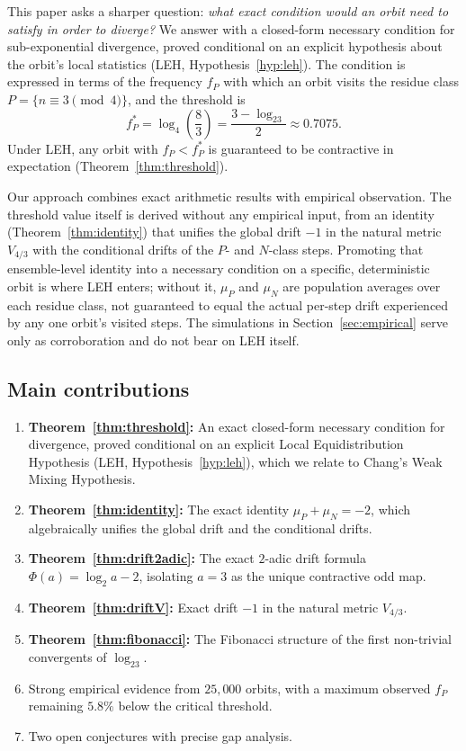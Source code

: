 \documentclass[12pt,reqno]{amsart}
\theoremstyle{plain}
\theoremstyle{definition}
\newcommand{\logtwo}{\log_2}
\newcommand{\logfour}{\log_4}
\newcommand{\fP}{f_P}
\newcommand{\fPstar}{f_P^*}
\newcommand{\muP}{\mu_P}
\newcommand{\muN}{\mu_N}
\newcommand{\PhiDrift}{\Phi}
\newcommand{\Vmetric}{V_{4/3}}
\begin{document}
This paper asks a sharper question: \emph{what exact condition would an orbit need
to satisfy in order to diverge?} We answer with a closed-form necessary condition
for sub-exponential divergence, proved conditional on an explicit hypothesis about
the orbit's local statistics (LEH, Hypothesis~\ref{hyp:leh}).
The condition is expressed in terms of the frequency $\fP$ with which an orbit
visits the residue class $P = \{n \equiv 3 \pmod{4}\}$, and the threshold is
\begin{equation}\label{eq:threshold}
\fPstar = \logfour\!\left(\frac{8}{3}\right) = \frac{3 - \logtwo 3}{2} \approx 0.7075.
\end{equation}
Under LEH, any orbit with $\fP < \fPstar$ is guaranteed to be contractive in expectation
(Theorem~\ref{thm:threshold}).

Our approach combines exact arithmetic results with empirical observation.
The threshold value itself is derived without any empirical input, from an identity
(Theorem~\ref{thm:identity}) that unifies the global drift $-1$ in the natural metric
$\Vmetric$ with the conditional drifts of the $P$- and $N$-class steps. Promoting that
ensemble-level identity into a necessary condition on a specific, deterministic orbit
is where LEH enters; without it, $\muP$ and $\muN$ are population averages over each
residue class, not guaranteed to equal the actual per-step drift experienced by any
one orbit's visited steps. The simulations in Section~\ref{sec:empirical} serve only
as corroboration and do not bear on LEH itself.

\subsection*{Main contributions}
\begin{enumerate}
\item \textbf{Theorem~\ref{thm:threshold}:} An exact closed-form necessary condition
for divergence, proved conditional on an explicit Local Equidistribution Hypothesis
(LEH, Hypothesis~\ref{hyp:leh}), which we relate to Chang's Weak Mixing Hypothesis.
\item \textbf{Theorem~\ref{thm:identity}:} The exact identity $\muP + \muN = -2$,
which algebraically unifies the global drift and the conditional drifts.
\item \textbf{Theorem~\ref{thm:drift2adic}:} The exact $2$-adic drift formula
$\PhiDrift(a) = \logtwo a - 2$, isolating $a=3$ as the unique contractive odd map.
\item \textbf{Theorem~\ref{thm:driftV}:} Exact drift $-1$ in the natural metric $\Vmetric$.
\item \textbf{Theorem~\ref{thm:fibonacci}:} The Fibonacci structure of the first
non-trivial convergents of $\logtwo 3$.
\item Strong empirical evidence from $25{,}000$ orbits, with a maximum observed $\fP$
remaining $5.8\%$ below the critical threshold.
\item Two open conjectures with precise gap analysis.
\end{enumerate}
\end{document}
